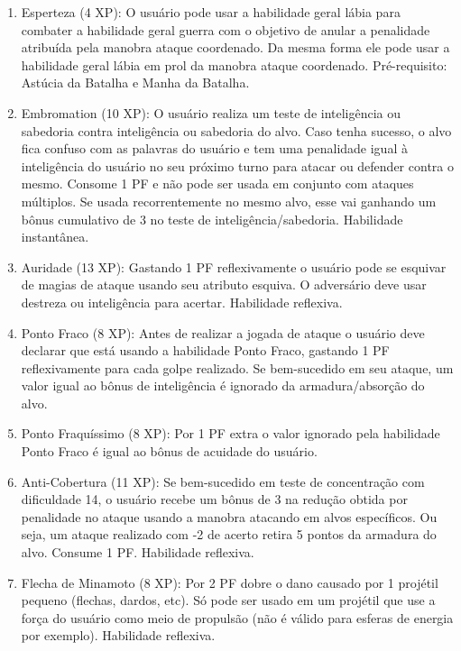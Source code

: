 \begin{enumerate}
	\item Esperteza (4 XP): O usuário pode usar a habilidade geral lábia para combater a habilidade geral guerra com o objetivo de anular a penalidade atribuída pela manobra ataque coordenado. Da mesma forma ele pode usar a habilidade geral lábia em prol da manobra ataque coordenado. Pré-requisito: Astúcia da Batalha e Manha da Batalha.
	
	\item Embromation (10 XP): O usuário realiza um teste de inteligência ou sabedoria contra inteligência ou sabedoria do alvo. Caso tenha sucesso, o alvo fica confuso com as palavras do usuário e tem uma penalidade igual à inteligência do usuário no seu próximo turno para atacar ou defender contra o mesmo. Consome 1 PF e não pode ser usada em conjunto com ataques múltiplos. Se usada recorrentemente no mesmo alvo, esse vai ganhando um bônus cumulativo de 3 no teste de inteligência/sabedoria. Habilidade instantânea.

  \item Auridade (13 XP): Gastando 1 PF reflexivamente o usuário pode se esquivar de magias de ataque usando seu atributo esquiva. O adversário deve usar destreza ou inteligência para acertar. Habilidade reflexiva.   

  \item Ponto Fraco (8 XP): Antes de realizar a jogada de ataque o usuário deve declarar que está usando a habilidade Ponto Fraco, gastando 1 PF reflexivamente para cada golpe realizado. Se bem-sucedido em seu ataque, um valor igual ao bônus de inteligência é ignorado da armadura/absorção do alvo.

  \item Ponto Fraquíssimo (8 XP): Por 1 PF extra o valor ignorado pela habilidade Ponto Fraco é igual ao bônus de acuidade do usuário.

	\item Anti-Cobertura (11 XP): Se bem-sucedido em teste de concentração com dificuldade 14, o usuário recebe um bônus de 3 na redução obtida por penalidade no ataque usando a manobra atacando em alvos específicos. Ou seja, um ataque realizado com -2 de acerto retira 5 pontos da armadura do alvo. Consume 1 PF. Habilidade reflexiva. 	

	\item Flecha de Minamoto (8 XP): Por 2 PF dobre o dano causado por 1 projétil pequeno (flechas, dardos, etc). Só pode ser usado em um projétil que use a força do usuário como meio de propulsão (não é válido para esferas de energia por exemplo). Habilidade reflexiva.


\end{enumerate}

